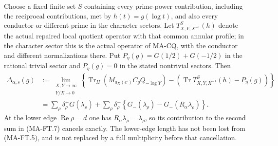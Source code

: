 Choose a fixed finite set $S$ containing every prime-power
contribution, including the reciprocal contributions, met by
$h(t)=g(\log t)$, and also every conductor or different prime
in the character sectors.  Let $T^S_{X,Y,X^{-1}}(h)$ denote the actual
repaired local quotient operator with that common annular profile;
in the character sector this is the actual operator of MA-CQ,
with the conductor and different normalizations there.
Put $P_\eta(g)=G(1/2)+G(-1/2)$ in the rational trivial sector
and $P_\eta(g)=0$ in the stated nontrivial sectors.  Then
\[
 \begin{split}
 \Delta_{\alpha,s}(g)
 &:=\lim_{\substack{X,Y\to\infty\\Y/X\to0}}
  \left\{\operatorname{Tr}_H(M_{a_X(e^\cdot)}C_gQ_{-\log Y})
       -\left(\operatorname{Tr}T^S_{X,Y,X^{-1}}(h)
                                     -P_\eta(g)\right)\right\}\\
 &=\sum_\rho\delta_\rho^+G(\lambda_\rho)
    +\sum_\rho\delta_\rho^-
       \left\{G_-(\lambda_\rho)
                         -G_-(R_\alpha\lambda_\rho)\right\}.
 \end{split}
 \tag{MA-FT.7}
\]
At the lower edge $\operatorname{Re}\rho=d$ one has
$R_\alpha\lambda_\rho=\lambda_\rho$, so its contribution
to the second sum in (MA-FT.7) cancels exactly.  The lower-edge
length has not been lost from (MA-FT.5), and is not replaced
by a full multiplicity before that cancellation.


